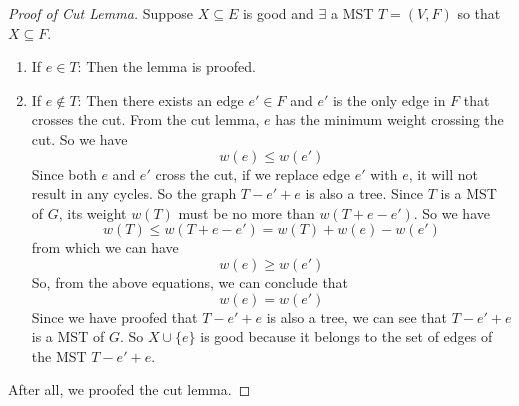 \documentclass[paper=a4, fontsize=11pt]{scrartcl} %
\numberwithin{figure}{section} %
\numberwithin{table}{section} %
\begin{document}
\begin{proof}[Proof of Cut Lemma]
    Suppose $X \subseteq E$ is good and $\exists$ a MST $T = (V, F)$ so that $X \subseteq F$.
    \begin{enumerate}
        \item If $e \in T$:
            Then the lemma is proofed.
        \item If $e \not \in T$:
            Then there exists an edge $e' \in F$ and $e'$ is the only edge in $F$ that crosses the cut. From the cut lemma, $e$ has the minimum weight crossing the cut. So we have
            \begin{equation}
                w(e) \leq w(e')
            \end{equation}
            Since both $e$ and $e'$ cross the cut, if we replace edge $e'$ with $e$, it will not result in any cycles. So the graph $T - e' + e$ is also a tree. Since $T$ is a MST of $G$, its weight $w(T)$ must be no more than $w(T + e - e')$. So we have
            \begin{equation}
                w(T) \leq w(T + e - e') = w(T) + w(e) - w(e')
            \end{equation}
            from which we can have
            \begin{equation}
                w(e) \geq w(e')
            \end{equation}
            So, from the above equations, we can conclude that
            \begin{equation}
                w(e) = w(e')
            \end{equation}
            Since we have proofed that $T - e' + e$ is also a tree, we can see that $T - e' + e$ is a MST of $G$. So $X \cup \{e\}$ is good because it belongs to the set of edges of the MST $T - e' + e$.
    \end{enumerate}
    After all, we proofed the cut lemma.
\end{proof}
\end{document}
